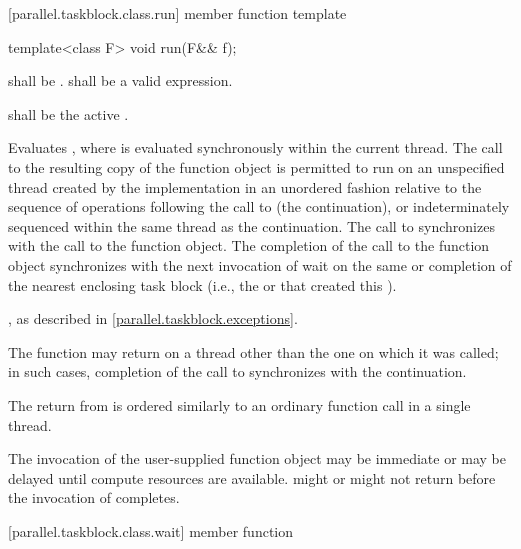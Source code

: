 [parallel.taskblock.class.run]{ member function template }

\begin{itemdecl}
template<class F> void run(F&& f);
\end{itemdecl}

\begin{itemdescr}
\pnum
\requires {} shall be .  shall be a valid expression.

\pnum
\preconditions {} shall be the active .

\pnum
\effects Evaluates , where
 is evaluated synchronously within the
current thread. The call to the resulting copy of the function object is
permitted to run on an unspecified thread created by the implementation in an
unordered fashion relative to the sequence of operations following the call to
 (the continuation), or indeterminately sequenced within the same thread
as the continuation. The call to  synchronizes with the call to the function
object. The completion of the call to the function object synchronizes with the
next invocation of wait on the same  or completion of the nearest
enclosing task block (i.e., the  or
     that created this ).

\pnum
\throws {}, as described in \ref{parallel.taskblock.exceptions}.

\pnum
\remarks The  function may return on a thread other than the
one on which it was called; in such cases, completion of the call to
 synchronizes with the continuation. \begin{note}The return from
 is ordered similarly to an ordinary function call in a single
thread.\end{note}

\pnum
\remarks The invocation of the user-supplied function object 
may be immediate or may be delayed until compute resources are available.
 might or might not return before the invocation of 
completes.

\end{itemdescr}

[parallel.taskblock.class.wait]{ member function }

